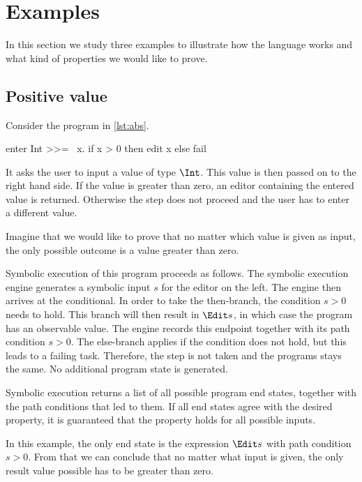 
\section{Examples}
\label{sec:examples}

In this section we study three examples to illustrate how the language works and what kind of properties we would like to prove.



\subsection{Positive value}

Consider the program in \cref{lst:abs}.

\begin{TASK}[float=h
            ,caption=A task that only accepts positive values as inputs.
            ,label=lst:abs
            ]
  enter Int >>= \ x. if x > 0 then edit x else fail
\end{TASK}

It asks the user to input a value of type $\Int$.
This value is then passed on to the right hand side.
If the value is greater than zero, an editor containing the entered value is returned.
Otherwise the step does not proceed and the user has to enter a different value.

Imagine that we would like to prove that no matter which value is given as input,
the only possible outcome is a value greater than zero.

Symbolic execution of this program proceeds as follows.
The symbolic execution engine generates a symbolic input $s$ for the editor on the left.
The engine then arrives at the conditional.
In order to take the then-branch, the condition $s > 0$ needs to hold.
This branch will then result in $\Edit s$, in which case the program has an observable value.
The engine records this endpoint together with its path condition $s > 0$.
The else-branch applies if the condition does not hold, but this leads to a failing task.
Therefore, the step is not taken and the programs stays the same.
No additional program state is generated.

Symbolic execution returns a list of all possible program end states, together with the path conditions that led to them.
If all end states agree with the desired property, it is guaranteed that the property holds for all possible inputs.

In this example, the only end state is the expression $\Edit s$ with path condition $s > 0$.
From that we can conclude that no matter what input is given, the only result value possible has to be greater than zero.



